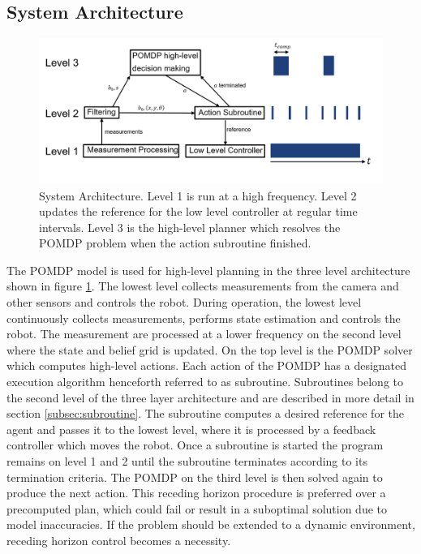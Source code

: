 \subsection{System Architecture}\label{subsec:sysarch}
\begin{figure}
    \centering
    \includegraphics[width=1.0\textwidth]{Report/images/3LevelArchitecture_botha.png}
    \caption{System Architecture. Level 1 is run at a high frequency. Level 2 updates the reference for the low level controller at regular time intervals. Level 3 is the high-level planner which resolves the POMDP problem when the action subroutine finished. }
    \label{fig:3levelsarchitecture}
\end{figure}
%
The POMDP model is used for high-level planning in the three level architecture shown in figure \ref{fig:3levelsarchitecture}. The lowest level collects measurements from the camera and other sensors and controls the robot. During operation, the lowest level continuously collects measurements, performs state estimation and controls the robot. The measurement are processed at a lower frequency on the second level where the state and belief grid is updated. On the top level is the POMDP solver which computes high-level actions. Each action of the POMDP has a designated execution algorithm henceforth referred to as subroutine. Subroutines belong to the second level of the three layer architecture and are described in more detail in section \ref{subsec:subroutine}. The subroutine computes a desired reference for the agent and passes it to the lowest level, where it is processed by a feedback controller which moves the robot. Once a subroutine is started the program remains on level 1 and 2 until the subroutine terminates according to its termination criteria. The POMDP on the third level is then solved again to produce the next action. This receding horizon procedure is preferred over a precomputed plan, which could fail or result in a suboptimal solution due to model inaccuracies. If the problem should be extended to a dynamic environment, receding horizon control becomes a necessity.\\

